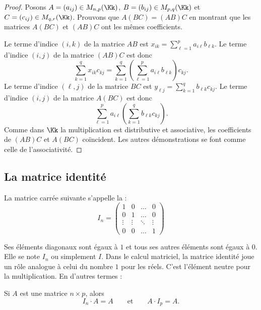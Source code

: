 \documentclass[class=report,crop=false]{standalone}
\begin{document}
\begin{proof}
Posons $A=(a_{ij}) \in M_{n,p}(\Kk)$, $B=(b_{ij})\in M_{p,q}(\Kk)$
et $C=(c_{ij})\in M_{q,r}(\Kk)$.
Prouvons que $A(BC) = (AB) C$ en montrant que les matrices $A(BC)$ et $(AB) C$
ont les mêmes coefficients.

Le terme d'indice $(i,k)$ de la matrice $AB$ est
$x_{ik}={\displaystyle \sum_{\ell=1}^{p}}a_{i \ell}b_{\ell k}$.
Le terme d'indice $(i,j)$ de la matrice $(AB)C$ est donc
$$ \sum_{k=1}^{q}x_{ik}c_{kj}=\sum_{k=1}^{q}
\left ( \sum_{\ell=1}^{p}a_{i\ell}b_{\ell k} \right )c_{kj}.$$
Le terme d'indice $(\ell,j)$ de la matrice $BC$ est
$y_{\ell j}={\displaystyle \sum_{k=1}^{q}}b_{\ell k}c_{kj}$.
Le terme d'indice $(i,j)$ de la matrice $A(BC)$ est donc
$$\sum_{\ell=1}^{p}a_{i\ell}\left (  \sum_{k=1}^{q}b_{\ell k}c_{kj}\right ).$$
Comme dans $\Kk$ la multiplication est distributive et associative,
les coefficients de $(AB)C$ et $A(BC)$ coïncident.
Les autres démonstrations se font comme celle de l'associativité.
\end{proof}

\subsection{La matrice identité}


La matrice carrée suivante s'appelle la  :
 \[
 I_n = \left(
 \begin{array}{cccc}
1 & 0 & \dots & 0\\
0& 1& \dots & 0\\
 \vdots& \vdots & \ddots  & \vdots\\
0 & 0 & \dots &1
\end{array}
\right)
 \]

Ses éléments diagonaux sont égaux à $1$ et tous ses autres éléments sont égaux à $0$.
Elle se note $I_n$ ou simplement $I$.
Dans le calcul matriciel, la matrice identité joue un rôle
analogue à celui du nombre $1$ pour les réels.
C'est l'élément neutre pour la multiplication. En
d'autres termes :

\begin{proposition}
Si $A$ est une matrice $n \times p$, alors
$$ I_n \cdot A = A \qquad \text{et} \qquad A \cdot I_p = A.$$
\end{proposition}
\end{document}
